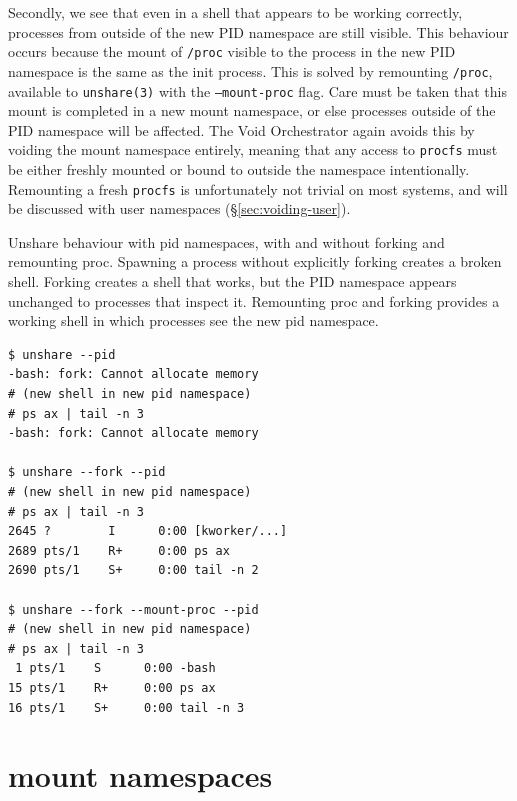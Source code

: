 \documentclass[12pt,a4paper,twoside]{report}
\begin{document}
Secondly, we see that even in a shell that appears to be working correctly, processes from outside of the new PID namespace are still visible. This behaviour occurs because the mount of \texttt{/proc} visible to the process in the new PID namespace is the same as the init process. This is solved by remounting \texttt{/proc}, available to \texttt{unshare(3)} with the \texttt{---mount-proc} flag. Care must be taken that this mount is completed in a new mount namespace, or else processes outside of the PID namespace will be affected. The Void Orchestrator again avoids this by voiding the mount namespace entirely, meaning that any access to \texttt{procfs} must be either freshly mounted or bound to outside the namespace intentionally. Remounting a fresh \texttt{procfs} is unfortunately not trivial on most systems, and will be discussed with user namespaces (§\ref{sec:voiding-user}).

\begin{listing}
\label{lst:unshare-pid}
\caption{Unshare behaviour with pid namespaces, with and without forking and remounting proc. Spawning a process without explicitly forking creates a broken shell. Forking creates a shell that works, but the PID namespace appears unchanged to processes that inspect it. Remounting proc and forking provides a working shell in which processes see the new pid namespace.}

\begin{verbatim}
$ unshare --pid
-bash: fork: Cannot allocate memory
# (new shell in new pid namespace)
# ps ax | tail -n 3
-bash: fork: Cannot allocate memory

$ unshare --fork --pid
# (new shell in new pid namespace)
# ps ax | tail -n 3
2645 ?        I      0:00 [kworker/...]
2689 pts/1    R+     0:00 ps ax
2690 pts/1    S+     0:00 tail -n 2

$ unshare --fork --mount-proc --pid
# (new shell in new pid namespace)
# ps ax | tail -n 3
 1 pts/1    S      0:00 -bash
15 pts/1    R+     0:00 ps ax
16 pts/1    S+     0:00 tail -n 3
\end{verbatim}
\end{listing}


\section{mount namespaces}
\label{sec:voiding-mount}
\end{document}
